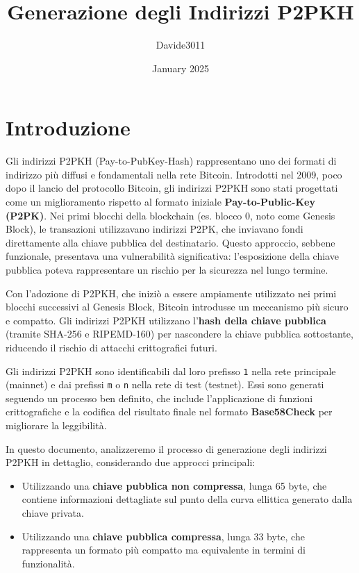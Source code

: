 \documentclass[a4paper,12pt]{article}
\title{Generazione degli Indirizzi P2PKH}
\author{Davide3011}
\date{January 2025}
\begin{document}
\maketitle

\section{Introduzione}

Gli indirizzi P2PKH (Pay-to-PubKey-Hash) rappresentano uno dei formati di indirizzo più diffusi e fondamentali nella rete Bitcoin. Introdotti nel 2009, poco dopo il lancio del protocollo Bitcoin, gli indirizzi P2PKH sono stati progettati come un miglioramento rispetto al formato iniziale \textbf{Pay-to-Public-Key (P2PK)}. Nei primi blocchi della blockchain (es. blocco 0, noto come Genesis Block), le transazioni utilizzavano indirizzi P2PK, che inviavano fondi direttamente alla chiave pubblica del destinatario. Questo approccio, sebbene funzionale, presentava una vulnerabilità significativa: l'esposizione della chiave pubblica poteva rappresentare un rischio per la sicurezza nel lungo termine.

Con l'adozione di P2PKH, che iniziò a essere ampiamente utilizzato nei primi blocchi successivi al Genesis Block, Bitcoin introdusse un meccanismo più sicuro e compatto. Gli indirizzi P2PKH utilizzano l'\textbf{hash della chiave pubblica} (tramite SHA-256 e RIPEMD-160) per nascondere la chiave pubblica sottostante, riducendo il rischio di attacchi crittografici futuri.

Gli indirizzi P2PKH sono identificabili dal loro prefisso \texttt{1} nella rete principale (mainnet) e dai prefissi \texttt{m} o \texttt{n} nella rete di test (testnet). Essi sono generati seguendo un processo ben definito, che include l'applicazione di funzioni crittografiche e la codifica del risultato finale nel formato \textbf{Base58Check} per migliorare la leggibilità.

In questo documento, analizzeremo il processo di generazione degli indirizzi P2PKH in dettaglio, considerando due approcci principali:
\begin{itemize}
    \item Utilizzando una \textbf{chiave pubblica non compressa}, lunga 65 byte, che contiene informazioni dettagliate sul punto della curva ellittica generato dalla chiave privata.
    \item Utilizzando una \textbf{chiave pubblica compressa}, lunga 33 byte, che rappresenta un formato più compatto ma equivalente in termini di funzionalità.
\end{itemize}
\end{document}
